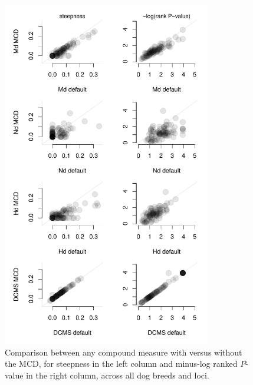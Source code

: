 \documentclass[12pt, oneside]{amsart}
\begin{document}
\newpage
\begin{figure}[h]
\begin{center}
\includegraphics[height=6in]{../figures_man2/S9-Dog_scatterCompareDefaultMCD.pdf}
\end{center}
\caption[]{Comparison between any compound measure with versus without the MCD, for steepness in the left column and minus-log ranked $P$-value in the right column, across all dog breeds and loci.}
 \label{fig:???}
\end{figure}
\end{document}
